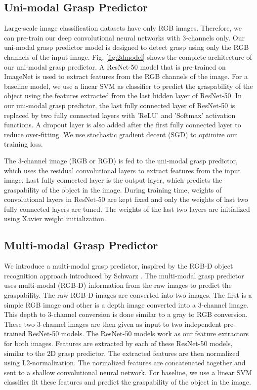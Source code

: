 \documentclass[10pt,twocolumn,letterpaper]{article}
\begin{document}
\subsection{Uni-modal Grasp Predictor}
Large-scale image classification datasets have only RGB images. Therefore, we can pre-train our deep convolutional neural networks with 3-channels only. Our uni-modal grasp predictor model is designed to detect grasp using only the RGB channels of the input image. Fig. \ref{fig:2dmodel} shows the complete architecture of our uni-modal grasp predictor. A ResNet-50 model that is pre-trained on ImageNet is used to extract features from the RGB channels of the image. For a baseline model, we use a linear SVM as classifier to predict the graspability of the object using the features extracted from the last hidden layer of ResNet-50. In our uni-modal grasp predictor, the last fully connected layer of ResNet-50 is replaced by two fully connected layers with 'ReLU' and 'Softmax' activation functions. A dropout layer is also added after the first fully connected layer to reduce over-fitting. We use stochastic gradient decent (SGD) to optimize our training loss.

The 3-channel image (RGB or RGD) is fed to the uni-modal grasp predictor, which uses the residual convolutional layers to extract features from the input image. Last fully connected layer is the output layer, which predicts the graspability of the object in the image. During training time, weights of convolutional layers in ResNet-50 are kept fixed and only the weights of last two fully connected layers are tuned. The weights of the last two layers are initialized using Xavier weight initialization.

\subsection{Multi-modal Grasp Predictor}
We introduce a multi-modal grasp predictor, inspired by the RGB-D object recognition approach introduced by Schwarz \etal \cite{schwarz2015rgb}. The multi-modal grasp predictor uses multi-modal (RGB-D) information from the raw images to predict the graspability. The raw RGB-D images are converted into two images. The first is a simple RGB image and other is a depth image converted into a 3-channel image. This depth to 3-channel conversion is done similar to a gray to RGB conversion. These two 3-channel images are then given as input to two independent pre-trained ResNet-50 models. The ResNet-50 models work as our feature extractors for both images. Features are extracted by each of these ResNet-50 models, similar to the 2D grasp predictor. The extracted features are then normalized using L2-normalization. The normalized features are concatenated together and sent to a shallow convolutional neural network. For baseline, we use a linear SVM classifier fit these features and predict the graspability of the object in the image.
\end{document}
